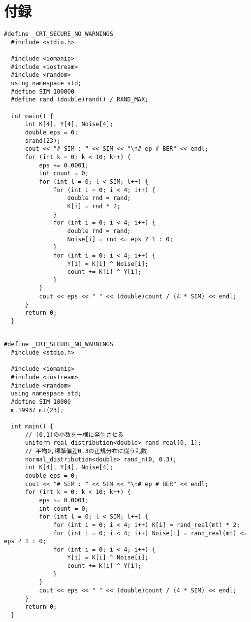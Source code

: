 \documentclass[12pt]{jarticle}
\begin{document}
\section{付録}
\begin{lstlisting}[title=ソースコード1,label=kadai1]
  #define _CRT_SECURE_NO_WARNINGS
  #include <stdio.h>
  
  #include <iomanip>
  #include <iostream>
  #include <random>
  using namespace std;
  #define SIM 100000
  #define rand (double)rand() / RAND_MAX;
  
  int main() {
      int K[4], Y[4], Noise[4];
      double eps = 0;
      srand(23);
      cout << "# SIM : " << SIM << "\n# ep # BER" << endl;
      for (int k = 0; k < 10; k++) {
          eps += 0.0001;
          int count = 0;
          for (int l = 0; l < SIM; l++) {
              for (int i = 0; i < 4; i++) {
                  double rnd = rand;
                  K[i] = rnd * 2;
              }
              for (int i = 0; i < 4; i++) {
                  double rnd = rand;
                  Noise[i] = rnd <= eps ? 1 : 0;
              }
              for (int i = 0; i < 4; i++) {
                  Y[i] = K[i] ^ Noise[i];
                  count += K[i] ^ Y[i];
              }
          }
          cout << eps << " " << (double)count / (4 * SIM) << endl;
      }
      return 0;
  }
  
\end{lstlisting}
\clearpage
\begin{lstlisting}[title=ソースコード2,label=kadai2]
  #define _CRT_SECURE_NO_WARNINGS
  #include <stdio.h>
  
  #include <iomanip>
  #include <iostream>
  #include <random>
  using namespace std;
  #define SIM 10000
  mt19937 mt(23);
  
  int main() {
      // [0,1]の小数を一様に発生させる　    　　
      uniform_real_distribution<double> rand_real(0, 1);
      // 平均0,標準偏差0.3の正規分布に従う乱数
      normal_distribution<double> rand_n(0, 0.3);
      int K[4], Y[4], Noise[4];
      double eps = 0;
      cout << "# SIM : " << SIM << "\n# ep # BER" << endl;
      for (int k = 0; k < 10; k++) {
          eps += 0.0001;
          int count = 0;
          for (int l = 0; l < SIM; l++) {
              for (int i = 0; i < 4; i++) K[i] = rand_real(mt) * 2;
              for (int i = 0; i < 4; i++) Noise[i] = rand_real(mt) <= eps ? 1 : 0;
              for (int i = 0; i < 4; i++) {
                  Y[i] = K[i] ^ Noise[i];
                  count += K[i] ^ Y[i];
              }
          }
          cout << eps << " " << (double)count / (4 * SIM) << endl;
      }
      return 0;
  }
\end{lstlisting}
\end{document}
